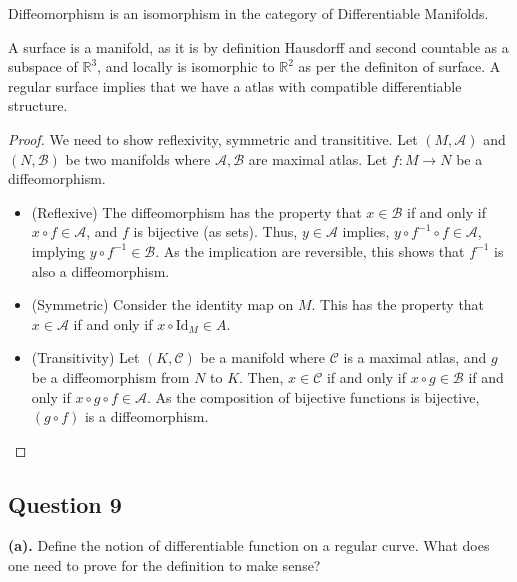 \documentclass[12pt]{article}
\begin{document}
\begin{theorem} Diffeomorphism is an isomorphism in the category of Differentiable Manifolds.
\end{theorem}

\begin{remark}
    A surface is a manifold, as it is by definition Hausdorff and second countable as a subspace of $\mathbb R^3$,
    and locally is isomorphic to $\mathbb R^2$ as per the definiton of surface.
    A regular surface implies that we have a atlas with compatible differentiable structure.
\end{remark}

\begin{proof}
    We need to show reflexivity, symmetric and transititive.
    Let $(M, \mathscr A)$ and $(N, \mathscr B)$ be two manifolds where $\mathscr A, \mathscr B$ are
    maximal atlas. Let $f: M \to N$ be a diffeomorphism.
    \begin{itemize}
        \item (Reflexive) The diffeomorphism has the property
        that $x \in \mathscr B$ if and only if $x \circ f \in \mathscr A$,
        and $f$ is bijective (as sets). Thus, $y \in \mathscr A$ implies, $y \circ f^{-1} \circ f \in \mathscr A$,
        implying $y \circ f^{-1} \in \mathscr B$. As the implication are reversible,
        this shows that $f^{-1}$ is also a diffeomorphism.
        \item (Symmetric) Consider the identity map on $M$. This has the property
        that $x \in \mathscr A$ if and only if $x \circ \mathrm{Id}_M \in A$.
        \item (Transitivity) Let $(K, \mathscr C)$ be a manifold where $\mathscr C$ is a maximal atlas,
        and $g$ be a diffeomorphism from $N$ to $K$.
        Then, $x \in \mathscr C$ if and only if $x \circ g \in \mathscr B$ if and only if $x \circ g \circ f \in \mathscr A.$
        As the composition of bijective functions is bijective, $(g \circ f)$ is a diffeomorphism.
    \end{itemize} 
\end{proof}

\subsection*{Question 9}

\textbf{(a).} Define the notion of differentiable function on a regular curve.
              What does one need to prove for the definition to make sense?
\end{document}

